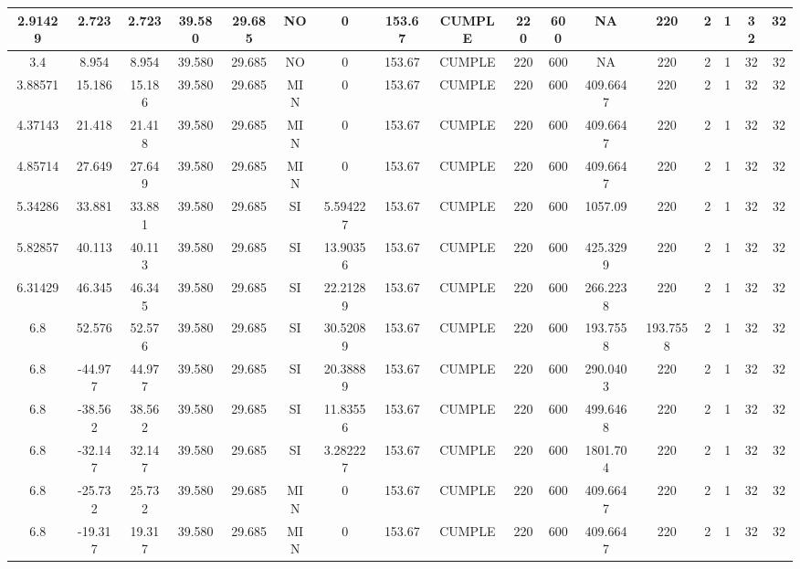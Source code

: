\begin{table}[H]
{\begin{tabular}{|c|c|c|c|c|c|c|c|c|c|c|c|c|c|c|c|c|}
    \hline
    2.91429 & 2.723 & 2.723 & 39.580 & 29.685 & NO  & 0   & 153.67 & CUMPLE & 220 & 600 & NA  & 220 & 2   & 1   & 32  & 32 \bigstrut\\
    \hline
    3.4 & 8.954 & 8.954 & 39.580 & 29.685 & NO  & 0   & 153.67 & CUMPLE & 220 & 600 & NA  & 220 & 2   & 1   & 32  & 32 \bigstrut\\
    \hline
    3.88571 & 15.186 & 15.186 & 39.580 & 29.685 & MIN & 0   & 153.67 & CUMPLE & 220 & 600 & 409.6647 & 220 & 2   & 1   & 32  & 32 \bigstrut\\
    \hline
    4.37143 & 21.418 & 21.418 & 39.580 & 29.685 & MIN & 0   & 153.67 & CUMPLE & 220 & 600 & 409.6647 & 220 & 2   & 1   & 32  & 32 \bigstrut\\
    \hline
    4.85714 & 27.649 & 27.649 & 39.580 & 29.685 & MIN & 0   & 153.67 & CUMPLE & 220 & 600 & 409.6647 & 220 & 2   & 1   & 32  & 32 \bigstrut\\
    \hline
    5.34286 & 33.881 & 33.881 & 39.580 & 29.685 & SI  & 5.594227 & 153.67 & CUMPLE & 220 & 600 & 1057.09 & 220 & 2   & 1   & 32  & 32 \bigstrut\\
    \hline
    5.82857 & 40.113 & 40.113 & 39.580 & 29.685 & SI  & 13.90356 & 153.67 & CUMPLE & 220 & 600 & 425.3299 & 220 & 2   & 1   & 32  & 32 \bigstrut\\
    \hline
    6.31429 & 46.345 & 46.345 & 39.580 & 29.685 & SI  & 22.21289 & 153.67 & CUMPLE & 220 & 600 & 266.2238 & 220 & 2   & 1   & 32  & 32 \bigstrut\\
    \hline
    6.8 & 52.576 & 52.576 & 39.580 & 29.685 & SI  & 30.52089 & 153.67 & CUMPLE & 220 & 600 & 193.7558 & 193.7558 & 2   & 1   & 32  & 32 \bigstrut\\
    \hline
    6.8 & -44.977 & 44.977 & 39.580 & 29.685 & SI  & 20.38889 & 153.67 & CUMPLE & 220 & 600 & 290.0403 & 220 & 2   & 1   & 32  & 32 \bigstrut\\
    \hline
    6.8 & -38.562 & 38.562 & 39.580 & 29.685 & SI  & 11.83556 & 153.67 & CUMPLE & 220 & 600 & 499.6468 & 220 & 2   & 1   & 32  & 32 \bigstrut\\
    \hline
    6.8 & -32.147 & 32.147 & 39.580 & 29.685 & SI  & 3.282227 & 153.67 & CUMPLE & 220 & 600 & 1801.704 & 220 & 2   & 1   & 32  & 32 \bigstrut\\
    \hline
    6.8 & -25.732 & 25.732 & 39.580 & 29.685 & MIN & 0   & 153.67 & CUMPLE & 220 & 600 & 409.6647 & 220 & 2   & 1   & 32  & 32 \bigstrut\\
    \hline
    6.8 & -19.317 & 19.317 & 39.580 & 29.685 & MIN & 0   & 153.67 & CUMPLE & 220 & 600 & 409.6647 & 220 & 2   & 1   & 32  & 32 \bigstrut\\

\end{tabular}}
\end{table}

